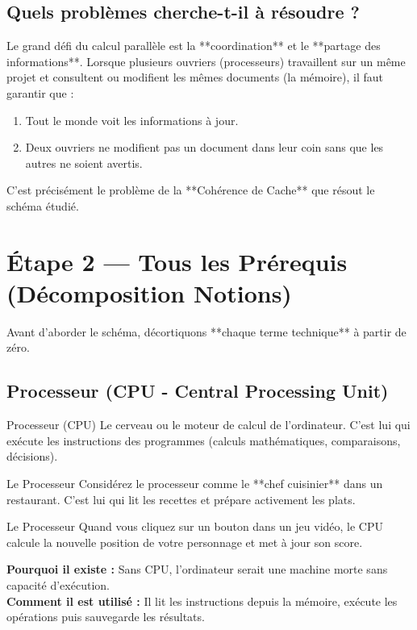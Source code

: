 \documentclass[12pt,a4paper]{article}
\begin{document}
\subsection{Quels problèmes cherche-t-il à résoudre ?}
Le grand défi du calcul parallèle est la **coordination** et le **partage des informations**. Lorsque plusieurs ouvriers (processeurs) travaillent sur un même projet et consultent ou modifient les mêmes documents (la mémoire), il faut garantir que :
\begin{enumerate}
    \item Tout le monde voit les informations à jour.
    \item Deux ouvriers ne modifient pas un document dans leur coin sans que les autres ne soient avertis.
\end{enumerate}
C'est précisément le problème de la **Cohérence de Cache** que résout le schéma étudié.

\newpage
\section{Étape 2 — Tous les Prérequis (Décomposition Notions)}

Avant d'aborder le schéma, décortiquons **chaque terme technique** à partir de zéro.

\subsection{Processeur (CPU - Central Processing Unit)}
\begin{definitionbox}{Processeur (CPU)}
Le cerveau ou le moteur de calcul de l'ordinateur. C'est lui qui exécute les instructions des programmes (calculs mathématiques, comparaisons, décisions).
\end{definitionbox}

\begin{analogybox}{Le Processeur}
Considérez le processeur comme le **chef cuisinier** dans un restaurant. C'est lui qui lit les recettes et prépare activement les plats.
\end{analogybox}

\begin{examplebox}{Le Processeur}
Quand vous cliquez sur un bouton dans un jeu vidéo, le CPU calcule la nouvelle position de votre personnage et met à jour son score.
\end{examplebox}
\textbf{Pourquoi il existe :} Sans CPU, l'ordinateur serait une machine morte sans capacité d'exécution.\\
\textbf{Comment il est utilisé :} Il lit les instructions depuis la mémoire, exécute les opérations puis sauvegarde les résultats.
\end{document}
